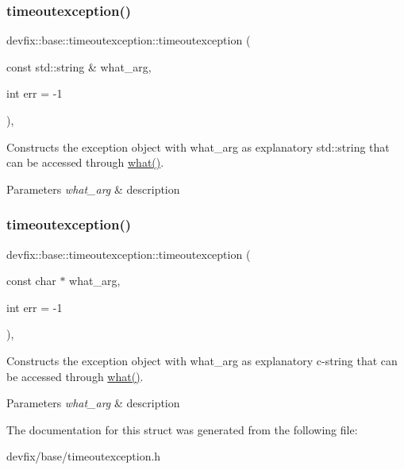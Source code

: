 \subsubsection{\texorpdfstring{timeoutexception()}{timeoutexception()}\hspace{0.1cm}{\footnotesize\ttfamily [1/2]}}
{\footnotesize\ttfamily devfix\+::base\+::timeoutexception\+::timeoutexception (\begin{DoxyParamCaption}\item[{const std\+::string \&}]{what\+\_\+arg,  }\item[{int}]{err = {\ttfamily -\/1} }\end{DoxyParamCaption})\hspace{0.3cm}{\ttfamily [inline]}, {\ttfamily [explicit]}}

Constructs the exception object with what\+\_\+arg as explanatory std\+::string that can be accessed through \hyperlink{structdevfix_1_1base_1_1exception_ad2066a6a81737c0fdf776120a6ca69d2}{what()}. 
\begin{DoxyParams}{Parameters}
{\em what\+\_\+arg} & description \\
\hline
\end{DoxyParams}
\mbox{\label{structdevfix_1_1base_1_1timeoutexception_a684cb2e6e0d78b98d30c505a6bf9066d}} 
\subsubsection{\texorpdfstring{timeoutexception()}{timeoutexception()}\hspace{0.1cm}{\footnotesize\ttfamily [2/2]}}
{\footnotesize\ttfamily devfix\+::base\+::timeoutexception\+::timeoutexception (\begin{DoxyParamCaption}\item[{const char $\ast$}]{what\+\_\+arg,  }\item[{int}]{err = {\ttfamily -\/1} }\end{DoxyParamCaption})\hspace{0.3cm}{\ttfamily [inline]}, {\ttfamily [explicit]}}

Constructs the exception object with what\+\_\+arg as explanatory c-\/string that can be accessed through \hyperlink{structdevfix_1_1base_1_1exception_ad2066a6a81737c0fdf776120a6ca69d2}{what()}. 
\begin{DoxyParams}{Parameters}
{\em what\+\_\+arg} & description \\
\hline
\end{DoxyParams}


The documentation for this struct was generated from the following file\+:\begin{DoxyCompactItemize}
\item 
devfix/base/timeoutexception.\+h\end{DoxyCompactItemize}
